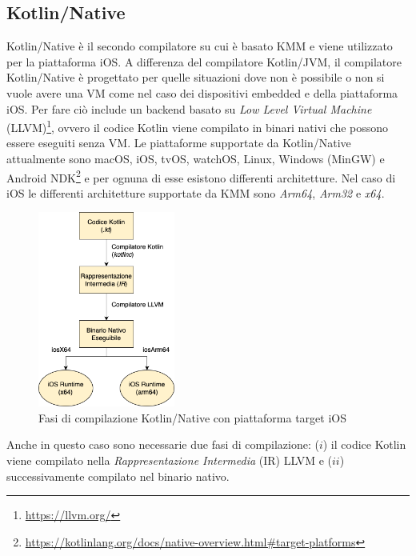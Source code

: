 \subsection{Kotlin/Native}
Kotlin/Native è il secondo compilatore su cui è basato KMM e viene utilizzato per la piattaforma iOS. A differenza del compilatore Kotlin/JVM, il compilatore Kotlin/Native è progettato per quelle situazioni dove non è possibile o non si vuole avere una VM come nel caso dei dispositivi embedded e della piattaforma iOS. Per fare ciò include un backend basato su \textit{Low Level Virtual Machine} (LLVM)\footnote{\url{https://llvm.org/}}, ovvero il codice Kotlin viene compilato in binari nativi che possono essere eseguiti senza VM\cite{nagy2022simplifying}. Le piattaforme supportate da Kotlin/Native attualmente sono macOS, iOS, tvOS, watchOS, Linux, Windows (MinGW) e Android NDK\footnote{\url{https://kotlinlang.org/docs/native-overview.html\#target-platforms}} e per ognuna di esse esistono differenti architetture. Nel caso di iOS le differenti architetture supportate da KMM sono \textit{Arm64}, \textit{Arm32} e \textit{x64}.
\begin{figure}[H]
\centering
\includegraphics[width=0.4\textwidth]{img/tesi-10-kotlinnative.drawio.png}
\caption{Fasi di compilazione Kotlin/Native con piattaforma target iOS}
\end{figure}
Anche in questo caso sono necessarie due fasi di compilazione: ($i$) il codice Kotlin viene compilato nella \textit{Rappresentazione Intermedia} (IR) LLVM e ($ii$) successivamente compilato nel binario nativo.

